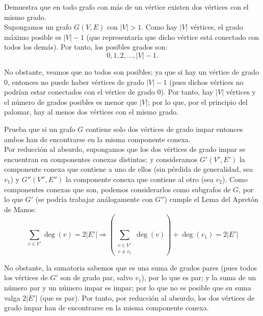 \begin{ejercicio}\label{ej:1.9}
    Demuestra que en todo grafo con más de un vértice existen dos vértices con el mismo grado.\\

    Supongamos un grafo $G(V,E)$ con $|V|>1$. Como hay $|V|$ vértices, el grado máximo posible es $|V|-1$ (que representaría que dicho vértice está conectado con todos los demás). Por tanto, los posibles grados son:
    \begin{equation*}
        0,1,2,\ldots,|V|-1.
    \end{equation*}

    No obstante, veamos que no todos son posibles; ya que si hay un vértice de grado 0, entonces no puede haber vértices de grado $|V|-1$ (pues dichos vértices no podrían estar conectados con el vértice de grado 0). Por tanto, hay $|V|$ vértices y el número de grados posibles es menor que $|V|$; por lo que, por el principio del palomar, hay al menos dos vértices con el mismo grado.
\end{ejercicio}

\begin{ejercicio}\label{ej:1.10}
    Prueba que si un grafo $G$ contiene solo dos vértices de grado impar entonces ambos han de encontrarse en la misma componente conexa.\\

    Por reducción al absurdo, supongamos que los dos vértices de grado impar se encuentran en componentes conexas distintas; y consideramos $G'(V',E')$ la componente conexa que contiene a uno de ellos (sin pérdida de generalidad, sea $v_1$) y $G''(V'',E'')$ la componente conexa que contiene al otro (sea $v_2$). Como componentes conexas que son, podemos considerarlos como subgrafos de $G$, por lo que $G'$ (se podría trabajar análogamente con $G''$) cumple el Lema del Apretón de Manos:
    \begin{equation*}
        \sum_{v\in V'}\deg(v) = 2|E'| \Longrightarrow \left(\sum_{\substack{v\in V'\\v\neq v_1}}\deg(v)\right) + \deg(v_1) = 2|E'|
    \end{equation*}

    No obstante, la sumatoria sabemos que es una suma de grados pares (pues todos los vértices de $G'$ son de grado par, salvo $v_1$), por lo que es par; y la suma de un número par y un número impar es impar; por lo que no es posible que su suma valga $2|E'|$ (que es par). Por tanto, por reducción al absurdo, los dos vértices de grado impar han de encontrarse en la misma componente conexa.
\end{ejercicio}

